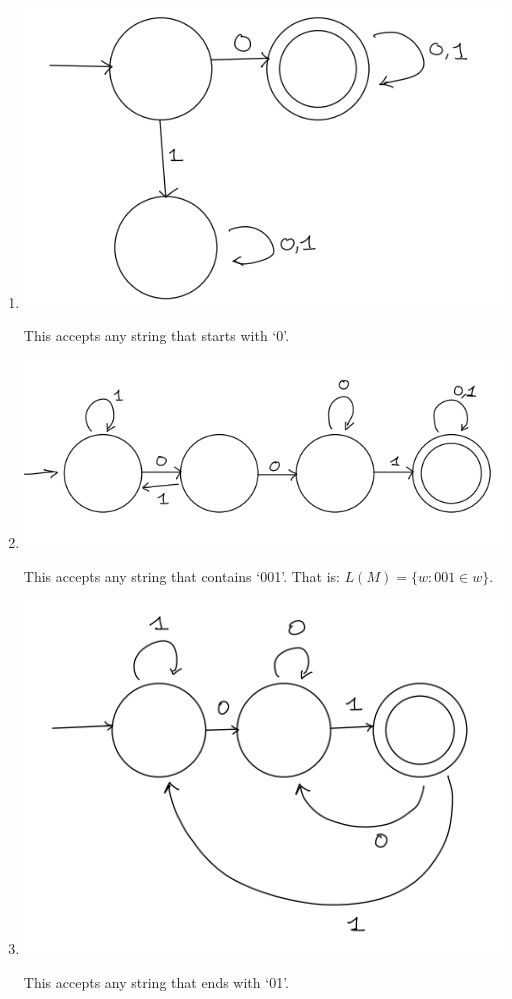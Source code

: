 \documentclass{article}
\begin{document}
    \begin{enumerate}
        \item \begin{center}
            \includegraphics[scale=0.5]{imgs/dfa-example1.png}
        \end{center}
        This accepts any string that starts with `0'.
        
        \item \begin{center}
            \includegraphics[scale=0.5]{imgs/dfa-example2.png}
        \end{center}
        This accepts any string that contains `001'. That is: $L(M) = \{w: 001 \in w\}$.
        
        \item \begin{center}
            \includegraphics[scale=0.5]{imgs/dfa-example3.png}
        \end{center}
        This accepts any string that ends with `01'.
    \end{enumerate}
\end{document}

